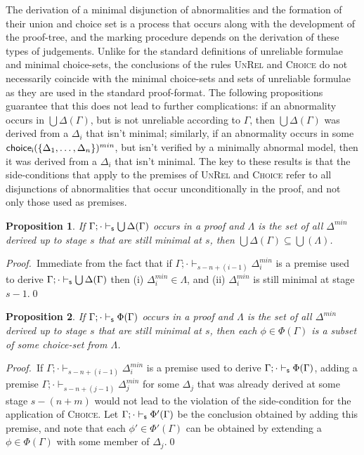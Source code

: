 \documentclass[]{article}
\newtheorem{proposition}{Proposition}
\newcommand{\Turn}[2]
    { {#1}\vdash_{\textbf{\sf s}}  {#2}}
\begin{document}
The derivation of a minimal disjunction of abnormalities and the formation of their union and choice set is a process that occurs along with the development of the proof-tree, and the marking procedure depends on the derivation of these types of judgements. Unlike for the standard definitions of unreliable formulae and minimal choice-sets, the conclusions of the rules \textsc{UnRel} and \textsc{Choice} do not necessarily coincide with the minimal choice-sets and sets of unreliable formulae as they are used in the standard proof-format. The following propositions guarantee that this does not lead to further complications: if an abnormality occurs in $\bigcup\Delta(\Gamma)$, but is not unreliable according to $\Gamma$, then $\bigcup\Delta(\Gamma)$ was derived from a $\Delta_i$ that isn't minimal; similarly, if an abnormality occurs in some ${\sf choice_{i}}(\{\Delta_{1},\ldots, \Delta_{n}\})^{min}$, but isn't verified by a minimally abnormal model, then it was derived from a $\Delta_i$ that isn't minimal. The key to these results is that the side-conditions that apply to the premises of \textsc{UnRel} and \textsc{Choice} refer to all disjunctions of abnormalities that occur unconditionally in the proof, and not only those used as premises.

\begin{proposition}\label{prop:unrel}
    If $\Turn{\Gamma;\cdot}{\bigcup\Delta(\Gamma)}$ occurs in a proof and $\Lambda$ is the set of all $\Delta^{min}$ derived up to stage $s$ that are still minimal at $s$, then $\bigcup\Delta(\Gamma) \subseteq \bigcup(\Lambda)$.
\end{proposition}
\noindent\textsl{Proof.}~Immediate from the fact that if $\Gamma; \cdot \vdash_{s - n  + (i-1)} \Delta_i^{min}$ is a premise used to derive $\Turn{\Gamma;\cdot}{\bigcup\Delta(\Gamma)}$ then (i) $\Delta_i^{min} \in \Lambda$, and (ii) $\Delta_i^{min}$ is still minimal at stage $s-1$.\qed

\begin{proposition}\label{prop:choice}
    If $\Turn{\Gamma;\cdot}{\Phi(\Gamma)}$ occurs in a proof and $\Lambda$ is the set of all $\Delta^{min}$ derived up to stage $s$ that are still minimal at $s$, then each $\phi \in \Phi(\Gamma)$ is a subset of some choice-set from $\Lambda$.
\end{proposition}
\noindent\textsl{Proof.}~If $\Gamma; \cdot \vdash_{s - n  + (i-1)} \Delta_i^{min}$ is a premise used to derive $\Turn{\Gamma;\cdot}{\Phi(\Gamma)}$, adding a premise $\Gamma; \cdot \vdash_{s - n  + (j-1)} \Delta_j^{min}$ for some $\Delta_j$ that was already derived at some stage $s - (n + m)$ would not lead to the violation of the side-condition for the application of \textsc{Choice}. Let $\Turn{\Gamma;\cdot}{\Phi'(\Gamma)}$ be the conclusion obtained by adding this premise, and note that each $\phi' \in \Phi'(\Gamma)$ can be obtained by extending a $\phi \in \Phi(\Gamma)$ with some member of $\Delta_j$.\qed
\end{document}
